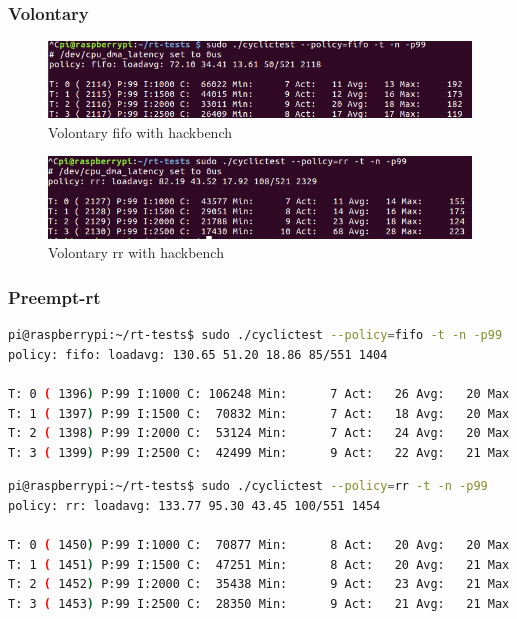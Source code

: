 \documentclass[10pt,a4paper]{article}
\begin{document}
\subsubsection{Volontary}
\begin{figure}[H]
\includegraphics[width=16cm]{Volontary-Fifo-WithHackbench1.png}
\caption{Volontary fifo with hackbench}
\end{figure}
\begin{figure}[H]
\includegraphics[width=16cm]{Volontary-Rr-WithHackbench1.png}
\caption{Volontary rr with hackbench}
\end{figure}
\subsubsection{Preempt-rt}
\begin{lstlisting}[language=bash,caption={Preempt fifo with hackbench}]
pi@raspberrypi:~/rt-tests$ sudo ./cyclictest --policy=fifo -t -n -p99
policy: fifo: loadavg: 130.65 51.20 18.86 85/551 1404           

T: 0 ( 1396) P:99 I:1000 C: 106248 Min:      7 Act:   26 Avg:   20 Max:      78
T: 1 ( 1397) P:99 I:1500 C:  70832 Min:      7 Act:   18 Avg:   20 Max:      73
T: 2 ( 1398) P:99 I:2000 C:  53124 Min:      7 Act:   24 Avg:   20 Max:      73
T: 3 ( 1399) P:99 I:2500 C:  42499 Min:      9 Act:   22 Avg:   21 Max:      74
\end{lstlisting}
\begin{lstlisting}[language=bash,caption={Preempt rr with hackbench}]
pi@raspberrypi:~/rt-tests$ sudo ./cyclictest --policy=rr -t -n -p99 
policy: rr: loadavg: 133.77 95.30 43.45 100/551 1454          

T: 0 ( 1450) P:99 I:1000 C:  70877 Min:      8 Act:   20 Avg:   20 Max:      91
T: 1 ( 1451) P:99 I:1500 C:  47251 Min:      8 Act:   20 Avg:   21 Max:      83
T: 2 ( 1452) P:99 I:2000 C:  35438 Min:      9 Act:   23 Avg:   21 Max:      69
T: 3 ( 1453) P:99 I:2500 C:  28350 Min:      9 Act:   21 Avg:   21 Max:      92
\end{lstlisting}
\end{document}
